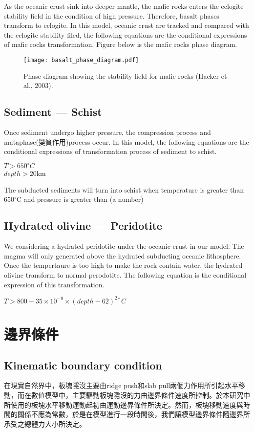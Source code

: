 As the oceanic crust sink into deeper mantle, the mafic rocks enters the eclogite stability field in the condition of high pressure. 
Therefore, basalt phases transform to eclogite.  
In this model, oceanic crust are tracked and compared with the eclogite stability filed, the following equations are the conditional expressions of mafic rocks transformation. 
Figure below is the mafic rocks phase diagram.
\begin{figure*}[ht!]
    \centering
    \texttt{[image: basalt\_phase\_diagram.pdf]}
    \caption{ Phase diagram showing the stability field for mafic rocks (Hacker et al., 2003).  }
    \label{fig:elastic}
\end{figure*}

\subsection{Sediment --- Schist}

Once sediment undergo higher pressure, the compression process and mataphase(變質作用)process occur.
In this model, the following equations are the conditional expressions of transformation process of sediment to schist.

$T > 650^{\circ} C$\\
$depth >  20 $km 

The subducted sediments will turn into schist when temperature is greater than 650$^\circ$C and pressure is greater than (a number)

\subsection{Hydrated olivine --- Peridotite}

We considering a hydrated peridotite under the oceanic crust in our model. 
The magma will only generated above the hydrated subducting oceanic lithosphere.
Once the tempertaure is too high to make the rock contain water, the hydrated olivine transform to normal perodotite.
The following equation is the conditional expression of this transformation.

$T > 800-35\times 10^{-9}\times (depth-62)^{2\circ}C$

\section{邊界條件}

\subsection{Kinematic boundary condition}
在現實自然界中，板塊隱沒主要由ridge push和slab pull兩個力作用所引起水平移動，而在數值模型中，主要驅動板塊隱沒的力由邊界條件速度所控制。於本研究中所使用的板塊水平移動運動起初由運動邊界條件所決定。然而，板塊移動速度與時間的關係不應為常數，於是在模型進行一段時間後，我們讓模型邊界條件隨邊界所承受之總體力大小所決定。

